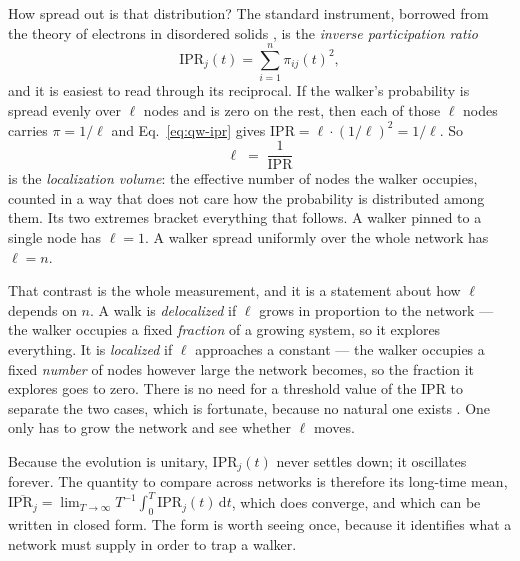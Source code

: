 How spread out is that distribution? The standard instrument, borrowed from the
theory of electrons in disordered solids \citep{thouless1974,wegner1980}, is the
\emph{inverse participation ratio}
\begin{equation}
  \mathrm{IPR}_j(t) = \sum_{i=1}^{n} \pi_{ij}(t)^2 ,
  \label{eq:qw-ipr}
\end{equation}
and it is easiest to read through its reciprocal. If the walker's probability is
spread evenly over $\ell$ nodes and is zero on the rest, then each of those $\ell$
nodes carries $\pi=1/\ell$ and Eq.~\eqref{eq:qw-ipr} gives
$\mathrm{IPR}=\ell\cdot(1/\ell)^2 = 1/\ell$. So
\begin{equation}
  \ell \;=\; \frac{1}{\mathrm{IPR}}
  \label{eq:qw-ell}
\end{equation}
is the \emph{localization volume}: the effective number of nodes the walker
occupies, counted in a way that does not care how the probability is distributed
among them. Its two extremes bracket everything that follows. A walker pinned to a
single node has $\ell=1$. A walker spread uniformly over the whole network has
$\ell=n$.

That contrast is the whole measurement, and it is a statement about how $\ell$
depends on $n$. A walk is \emph{delocalized} if $\ell$ grows in proportion to the
network --- the walker occupies a fixed \emph{fraction} of a growing system, so it
explores everything. It is \emph{localized} if $\ell$ approaches a constant --- the
walker occupies a fixed \emph{number} of nodes however large the network becomes,
so the fraction it explores goes to zero. There is no need for a threshold value of
the IPR to separate the two cases, which is fortunate, because no natural one
exists \citep{boettcher2025localization}. One only has to grow the network and see
whether $\ell$ moves.

Because the evolution is unitary, $\mathrm{IPR}_j(t)$ never settles down; it
oscillates forever. The quantity to compare across networks is therefore its
long-time mean, $\overline{\mathrm{IPR}_j} = \lim_{T\to\infty}T^{-1}\int_0^T
\mathrm{IPR}_j(t)\,\mathrm{d}t$, which does converge, and which can be written in
closed form. The form is worth seeing once, because it identifies what a network
must supply in order to trap a walker.

